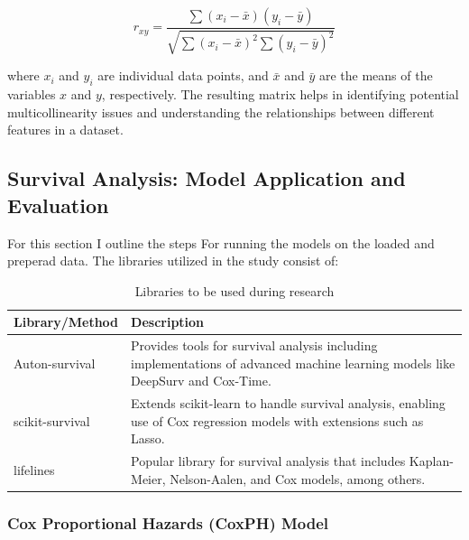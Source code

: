 \[
r_{xy} = \frac{\sum (x_i - \bar{x})(y_i - \bar{y})}{\sqrt{\sum (x_i - \bar{x})^2 \sum (y_i - \bar{y})^2}}
\]

\noindent where \( x_i \) and \( y_i \) are individual data points, and \( \bar{x} \) and \( \bar{y} \) are the means of the variables \( x \) and \( y \), respectively. The resulting matrix helps in identifying potential multicollinearity issues and understanding the relationships between different features in a dataset.


\subsection{Survival Analysis: Model Application and Evaluation}

\noindent For this section I outline the steps For running the models on the loaded and preperad data. The libraries utilized in the study consist of:

\begin{table}[h]
\begin{tabularx}{\textwidth}{|X|X|}
\hline
Library/Method & Description \\
\hline
Auton-survival \parencite{nagpal_auton-survival_2022} & Provides tools for survival analysis including implementations of advanced machine learning models like DeepSurv and Cox-Time. \\
\hline
scikit-survival \parencite{sebastian_polsterl_scikit-survival_2023} & Extends scikit-learn \parencite{scikit-learn} to handle survival analysis, enabling use of Cox regression models with extensions such as Lasso. \\
\hline
lifelines \parencite{davidson-pilon_lifelines_2024} & Popular library for survival analysis that includes Kaplan-Meier, Nelson-Aalen, and Cox models, among others. \\
\hline
\end{tabularx}
\caption{Libraries to be used during research}
\label{tab:libs}
\end{table}

\subsubsection*{Cox Proportional Hazards (CoxPH) Model}

